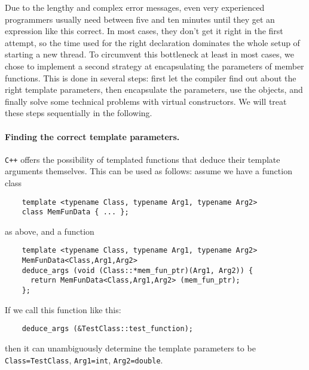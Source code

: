 \documentclass[11pt]{article}
\begin{document}
Due to the lengthy and complex error messages, even very experienced
programmers usually need between five and ten minutes until they get an
expression like this correct. In most cases, they don't get it right in the
first attempt, so the time used for the right declaration dominates the whole
setup of starting a new thread. To circumvent this bottleneck at least in most
cases, we chose to implement a second strategy at encapsulating the parameters
of member functions. This is done in several steps: first let the compiler
find out about the right template parameters, then encapsulate the parameters,
use the objects, and finally solve some technical problems with virtual
constructors. We will treat these steps sequentially in the following.


\paragraph{Finding the correct template parameters.}
\texttt{C++} offers the possibility of templated functions that deduce their
template arguments themselves. This can be used as follows: assume we have a
function class
\begin{verbatim}
    template <typename Class, typename Arg1, typename Arg2>
    class MemFunData { ... };
\end{verbatim}
as above, and a function
\begin{verbatim}
    template <typename Class, typename Arg1, typename Arg2>
    MemFunData<Class,Arg1,Arg2>
    deduce_args (void (Class::*mem_fun_ptr)(Arg1, Arg2)) {
      return MemFunData<Class,Arg1,Arg2> (mem_fun_ptr);
    };
\end{verbatim}
If we call this function like this:
\begin{verbatim}
    deduce_args (&TestClass::test_function);
\end{verbatim}
then it can unambiguously determine the template parameters to be
\texttt{Class=TestClass}, \texttt{Arg1=int}, \texttt{Arg2=double}. 
\end{document}
